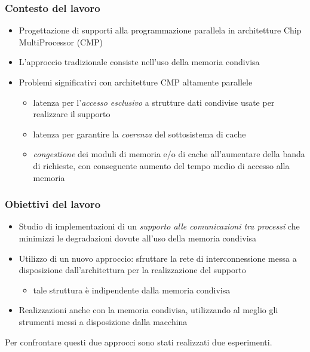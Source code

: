 \documentclass{beamer}
\begin{document}
\begin{frame}
  \frametitle{Contesto del lavoro}
  \begin{itemize}
  \item Progettazione di supporti alla programmazione parallela in architetture Chip MultiProcessor (CMP) 
  \item L'approccio tradizionale consiste nell'uso della memoria condivisa
  \item Problemi significativi con architetture CMP altamente parallele
    \begin{itemize}
    \item latenza per l'\emph{accesso esclusivo} a strutture dati condivise usate per realizzare il supporto
    \item latenza per garantire la \emph{coerenza} del sottosistema di cache
    \item \emph{congestione} dei moduli di memoria e/o di cache all'aumentare della banda di richieste, con conseguente aumento del tempo medio di accesso alla memoria
    \end{itemize}
  \end{itemize}
\end{frame}

\begin{frame}
  \frametitle{Obiettivi del lavoro}
  \begin{itemize}
  \item Studio di implementazioni di un \emph{supporto alle comunicazioni tra processi} che minimizzi le degradazioni dovute all'uso della memoria condivisa
  \item Utilizzo di un nuovo approccio: sfruttare la rete di interconnessione messa a disposizione dall'architettura per la realizzazione del supporto
    \begin{itemize}
    \item tale struttura \`e indipendente dalla memoria condivisa 
    \end{itemize}
  \item Realizzazioni anche con la memoria condivisa, utilizzando al meglio gli strumenti messi a disposizione dalla macchina
  \end{itemize}
  Per confrontare questi due approcci sono stati realizzati due esperimenti.
\end{frame}
\end{document}
